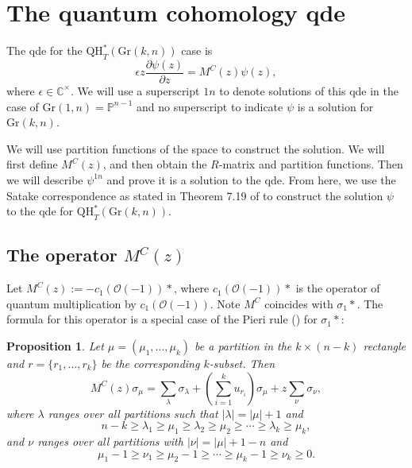 \documentclass[12pt]{article}
\newtheorem{proposition}[theorem]{Proposition}
\newcommand{\OC}{\mathcal{O}}
\newcommand{\bb}[1]{\mathbb{#1}}
\theoremstyle{plain}
\theoremstyle{definition}
\begin{document}
\section{The quantum cohomology qde} \label{quantumcohomologysection}


The qde for the $\mathrm{QH}^*_T(\mathrm{Gr}(k,n))$ case is 
\begin{equation}
    \epsilon z\frac{\partial \psi(z)}{\partial z} = M^{C } (z) \psi(z),
\end{equation}
where $\epsilon \in \mathbb{C}^\times$. We will use a superscript $1n$ to denote solutions of this qde in the case of $\mathrm{Gr}(1,n) = \bb P^{n-1}$ and no superscript to indicate $\psi$ is a solution for $\mathrm{Gr}(k,n).$ 

We will use partition functions of the space to construct the solution. We will first define $M^C (z)$, and then obtain the $R$-matrix and partition functions. Then we will describe $\psi^{1n}$ and prove it is a solution to the qde. From here, we use the Satake correspondence as stated in Theorem 7.19 of \cite{cotti2024satakecorrespondenceequivariantquantum} to construct the solution $\psi$ to the qde for $\mathrm{QH}^*_T (\mathrm{Gr}(k,n))$.

\subsection{The operator \texorpdfstring{$M^C(z)$}{MC(z)}}
Let $M^C(z) := -c_1(\OC(-1)) *$, where $c_1(\OC(-1)) *$ is the operator of quantum multiplication by $c_1 (\mathcal O(-1))$. Note $M^C$ coincides with $\sigma_1 *$. The formula for this operator is a special case of the Pieri rule (\cite{mihalcea2004equivariantquantumschubertcalculus}) for $\sigma_1 *$: 
\begin{proposition} \label{cpieri}
Let $\mu =(\mu_1,\dots,\mu_k)$ be a partition in the $k \times (n-k)$ rectangle and $r=\{r_1,\dots,r_k\}$ be the corresponding $k$-subset. Then $$M^C(z) \sigma_\mu = \sum_\lambda \sigma_\lambda +\left(\sum _{i=1} ^k u_{r_i}\right)\sigma_\mu + z \sum_\nu \sigma_\nu ,$$ where $\lambda$ ranges over all partitions such that $|\lambda| = |\mu| +1$ and $$n-k \geq \lambda_1 \geq \mu_1 \geq \lambda_2 \geq \mu_2 \geq \cdots \geq \lambda_k \geq \mu_k,$$
and $\nu$ ranges over all partitions with $|\nu| = |\mu|+1-n$ and 
$$\mu_1-1 \geq \nu_1 \geq \mu_2-1 \geq \cdots \geq \mu_k -1 \geq \nu_k \geq 0.$$
\end{proposition}
\end{document}
